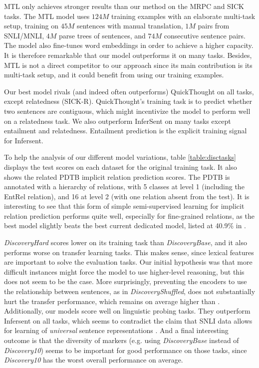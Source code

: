 \documentclass[11pt,a4paper]{article}
\begin{document}
MTL \cite{subramanian2018learning} only achieves stronger results than our method on the MRPC and SICK tasks. The MTL model uses $124M$ training examples with an elaborate multi-task setup, training on $45M$ sentences with manual translation, $1M$ pairs from SNLI/MNLI, $4M$ parse trees of sentences, and $74M$ consecutive sentence pairs. The model also fine-tunes word embeddings in order to achieve a higher capacity. It is therefore remarkable that our model outperforms it on many tasks. Besides, MTL is not a direct competitor to our approach since its main contribution is its multi-task setup, and it could benefit from using our training examples. 

Our best model rivals (and indeed often outperforms) QuickThought on all tasks, except relatedness (SICK-R). QuickThought's training task is to predict whether two sentences are contiguous, which might incentivize the model to perform well on a relatedness task. We also outperform InferSent on many tasks except entailment and relatedness. Entailment prediction is the explicit training signal for Infersent.

To help the analysis of our different model variations, table \ref{table:disctasks} displays the test scores on each dataset for the original training task. It also shows the related PDTB implicit relation prediction scores. 
The PDTB is annotated with a hierarchy of relations, with 5 classes at level 1 (including the EntRel relation), and 16 at level 2 (with one relation absent from the test). 
It is interesting to see that this form of simple semi-supervised learning for implicit relation prediction performs quite well, especially for fine-grained relations, as the best model slightly beats the best current dedicated model, listed at 40.9\% in \citet{DBLP:conf/eacl/XueDR17}. 




{\it DiscoveryHard} scores lower on its training task than {\it DiscoveryBase}, and it also performs worse on transfer learning tasks. This makes sense, since lexical features are important to solve the evaluation tasks. Our initial hypothesis was that more difficult instances might force the model to use higher-level reasoning, but this does not seem to be the case. More surprisingly, preventing the encoders to use the relationship between sentences, as in {\it DiscoveryShuffled}, does not substantially hurt the transfer performance, which remains on average higher than \citet{Nie2017}. Additionally,  our models score well on linguistic probing tasks. They outperform Infersent on all tasks, which seems to contradict the claim that SNLI data allows for learning of {\it universal} sentence representations \citep{Conneau2017}. And a final interesting outcome is that the diversity of markers (e.g. using {\it DiscoveryBase} instead of {\it Discovery10})  seems to be important for good performance on those tasks, since {\it Discovery10} has the worst overall performance on average.
\end{document}
